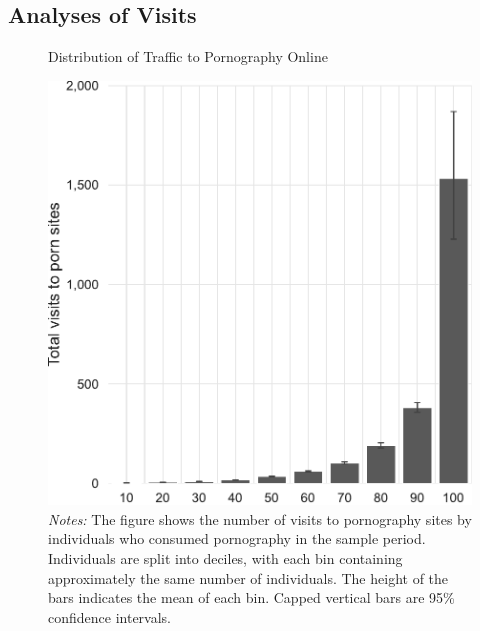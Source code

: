 \documentclass[12pt, letterpaper]{article}
\begin{document}
\subsection{Analyses of Visits}
\label{si:visits}
\begin{figure}[ht]
	\centering
	\caption{Distribution of Traffic to Pornography Online}
	\includegraphics[width=.5\linewidth]{figs/distribution_visits_to_adultsites.pdf}
	\caption*{\footnotesize \emph{Notes:} 
		The figure shows the number of visits to pornography sites by individuals who consumed pornography in the sample period.
		Individuals are split into deciles, with each bin containing approximately the same number of individuals.
		The height of the bars indicates the mean of each bin.
		Capped vertical bars are 95\% confidence intervals.
	}
	\label{fig:distribution_visits}
\end{figure}
\end{document}
